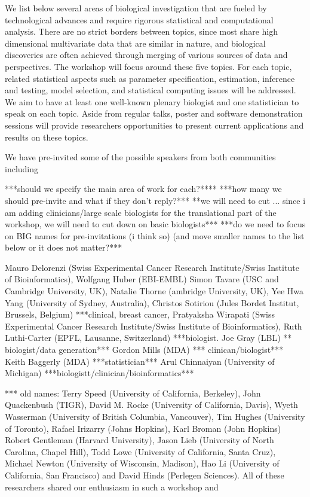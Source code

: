 \documentclass[12pt]{amsart}
\begin{document}
We list below several areas of biological investigation that are
fueled by technological advances and require rigorous statistical and
computational analysis. 
There are no strict borders between topics,
since most share high dimensional multivariate data that are
similar in nature, and biological discoveries are often achieved
through merging of various sources of data and perspectives. 
The workshop will focus around these five topics.  
For each topic, related statistical aspects such as 
parameter specification, estimation,
inference and testing, model selection, and statistical computing
issues will be addressed. 
We aim to have at least one well-known plenary biologist 
and one statistician to speak on each topic.  
Aside from regular talks, poster and software 
demonstration sessions will provide researchers opportunities
to present current applications and results on these topics.  

We have pre-invited some of the possible speakers from both
communities including 

***should we specify the main area of work for each?****
***how many we should pre-invite and what if they don't reply?***
**we will need to cut ... since i am adding clinicians/large scale biologists for the translational part of the workshop, we will need to cut down on basic biologists***
***do we need to focus on BIG names for pre-invitations (i think so) (and move smaller names to the list below or it does not matter?***

Mauro Delorenzi (Swiss Experimental Cancer Research Institute/Swiss Institute of Bioinformatics),
Wolfgang Huber (EBI-EMBL)
Simon Tavare (USC and Cambridge University, UK),
Natalie Thorne (ambridge University, UK),
Yee Hwa Yang (University of Sydney, Australia),
Christos Sotiriou (Jules Bordet Institut, Brussels, Belgium) ***clinical, breast cancer,
Pratyaksha Wirapati (Swiss Experimental Cancer Research Institute/Swiss Institute of Bioinformatics),
Ruth Luthi-Carter (EPFL, Lausanne, Switzerland) ***biologist.
Joe Gray (LBL) ** biologist/data generation***
Gordon Mills (MDA) *** clinican/biologist***
Keith Baggerly (MDA) ***statistician***
Arul Chinnaiyan (University of Michigan) ***biologistt/clinician/bioinformatics***

*** old names:  Terry Speed (University of California,
Berkeley), John Quackenbush (TIGR), David M. Rocke (University of
California, Davis), Wyeth Wasserman (University of British Columbia,
Vancouver),
Tim Hughes (University of Toronto), Rafael Irizarry (Johns Hopkins), Karl Broman (John Hopkins)
Robert Gentleman (Harvard University), Jason Lieb (University of North
Carolina, Chapel Hill), Todd Lowe (University of California, Santa
Cruz), Michael Newton (University of Wisconsin, Madison), Hao Li (University of California, San Francisco)
 and David Hinds (Perlegen  Sciences). 
All of these researchers shared our enthusiasm in such a workshop and
\end{document}
